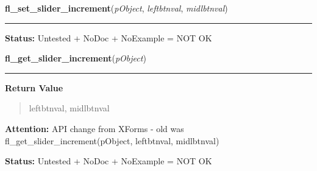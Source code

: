     \label{xformslib:library:fl_set_slider_increment}

    \vspace{0.5ex}

\hspace{.8\funcindent}\begin{boxedminipage}{\funcwidth}

    \raggedright \textbf{fl\_set\_slider\_increment}(\textit{pObject}, \textit{leftbtnval}, \textit{midlbtnval})

    \vspace{-1.5ex}

    \rule{\textwidth}{0.5\fboxrule}
\setlength{\parskip}{2ex}
\setlength{\parskip}{1ex}
\textbf{Status:} Untested + NoDoc + NoExample = NOT OK



    \end{boxedminipage}

    \label{xformslib:library:fl_get_slider_increment}

    \vspace{0.5ex}

\hspace{.8\funcindent}\begin{boxedminipage}{\funcwidth}

    \raggedright \textbf{fl\_get\_slider\_increment}(\textit{pObject})

    \vspace{-1.5ex}

    \rule{\textwidth}{0.5\fboxrule}
\setlength{\parskip}{2ex}
\setlength{\parskip}{1ex}
      \textbf{Return Value}
    \vspace{-1ex}

      \begin{quote}
      leftbtnval, midlbtnval

      \end{quote}

\textbf{Attention:} API change from XForms - old was fl\_get\_slider\_increment(pObject, 
leftbtnval, midlbtnval)



\textbf{Status:} Untested + NoDoc + NoExample = NOT OK



    \end{boxedminipage}


